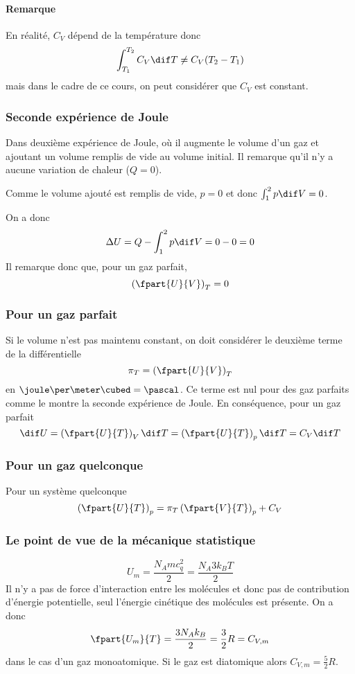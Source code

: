 \paragraph{Remarque}
En réalité, $C_V$ dépend de la température donc
\[ \int_{T_1}^{T_2} C_V \dif T \neq C_V(T_2 - T_1) \]
mais dans le cadre de ce cours, on peut considérer que $C_V$ est constant.

\subsubsection{Seconde expérience de Joule}
Dans deuxième expérience de Joule,
où il augmente le volume d'un gaz et ajoutant
un volume remplis de vide au volume initial.
Il remarque qu'il n'y a aucune variation de chaleur ($Q = 0$).

Comme le volume ajouté est remplis de vide, $p = 0$ et donc
$\int_1^2 p \dif V = 0$.

On a donc
\[ \Delta U = Q - \int_1^2 p \dif V  = 0 - 0 = 0 \]
Il remarque donc que, pour un gaz parfait,
\[ \left(\fpart{U}{V}\right)_T = 0 \]

\subsubsection{Pour un gaz parfait}
Si le volume n'est pas maintenu constant,
on doit considérer le deuxième terme de la différentielle
\[ \pi_T = \left(\fpart{U}{V}\right)_T \]
en $\joule\per\meter\cubed = \pascal$.
Ce terme est nul pour des gaz parfaits comme le montre
la seconde expérience de Joule.
En conséquence, pour un gaz parfait
\begin{equation}
  \dif U = \left(\fpart{U}{T}\right)_V \dif T =
  \left(\fpart{U}{T}\right)_p \dif T = C_V\dif T \label{eq:peru}
\end{equation}

\subsubsection{Pour un gaz quelconque}
Pour un système quelconque
\begin{equation}
  \left(\fpart{U}{T}\right)_p =
  \pi_T \left(\fpart{V}{T}\right)_p + C_V \label{eq:dudtp}
\end{equation}

\subsubsection{Le point de vue de la mécanique statistique}
\[ U_m = \frac{N_A mc_q^2}{2} = \frac{N_A 3k_BT}{2} \]
Il n'y a pas de force d'interaction entre les molécules et
donc pas de contribution d'énergie potentielle,
seul l'énergie cinétique des molécules est présente.
On a donc
\[ \fpart{U_m}{T} = \frac{3N_A k_B}{2} = \frac 32R = C_{V,m} \]
dans le cas d'un gaz monoatomique.
Si le gaz est diatomique alors $C_{V,m} = \frac 52R$.

